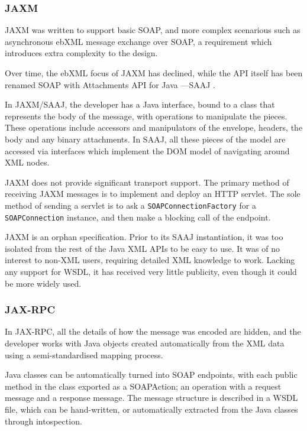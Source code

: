 \subsubsection{JAXM}

JAXM was written to support basic SOAP, and more complex scenarious
such as asynchronous ebXML message exchange over SOAP, a requirement
which introduces extra complexity to the design. 

Over time, the ebXML focus of JAXM has declined, while the API itself
has been renamed  SOAP with Attachments API for Java ---SAAJ \cite{spec:SAAJ-12}. 

In JAXM/SAAJ, the developer has a Java interface, bound to a 
class that represents the body of the message, with operations to
manipulate the pieces. These operations include accessors and
manipulators of the envelope, headers, the body and any binary attachments. In
SAAJ, all these pieces of the model are accessed via interfaces which
implement the DOM \cite{spec:DOM} model of navigating around XML nodes.

JAXM does not provide significant transport support. The primary method
of receiving JAXM messages is to implement and deploy an HTTP servlet.
The sole method of sending a servlet is to ask a
\verb|SOAPConnectionFactory| for a \verb|SOAPConnection| instance, and
then make a blocking call of the endpoint.

JAXM is an orphan specification. Prior to its SAAJ instantiation, it
was too isolated from the rest of the Java XML APIs to be easy to use.
It was of no interest to non-XML users, requiring detailed XML
knowledge to work. Lacking any support for WSDL, it has received very
little publicity, even though it could be more widely used.  

\subsubsection{JAX-RPC}

In JAX-RPC, all the details of how the message was
encoded are hidden, and the developer works with Java objects created
automatically from the XML data using a semi-standardised mapping process.

Java classes can be automatically turned into SOAP endpoints, with each
public method in the class exported as a SOAPAction; an operation with a
request message and a response message. The message structure is
described in a WSDL file, which can be hand-written, or automatically
extracted from the Java classes through intospection.

